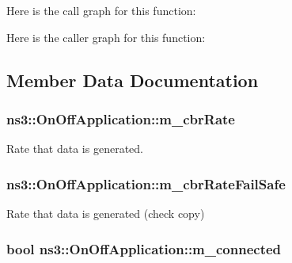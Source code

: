 Here is the call graph for this function\+:




Here is the caller graph for this function\+:




\subsection{Member Data Documentation}
\subsubsection[{\texorpdfstring{m\+\_\+cbr\+Rate}{m_cbrRate}}]{ ns3\+::\+On\+Off\+Application\+::m\+\_\+cbr\+Rate\hspace{0.3cm}{\ttfamily [private]}}\hypertarget{classns3_1_1OnOffApplication_ae81a8be6c1ce4bef91e89cc2c44e5bcf}{}\label{classns3_1_1OnOffApplication_ae81a8be6c1ce4bef91e89cc2c44e5bcf}


Rate that data is generated. 

\subsubsection[{\texorpdfstring{m\+\_\+cbr\+Rate\+Fail\+Safe}{m_cbrRateFailSafe}}]{ ns3\+::\+On\+Off\+Application\+::m\+\_\+cbr\+Rate\+Fail\+Safe\hspace{0.3cm}{\ttfamily [private]}}\hypertarget{classns3_1_1OnOffApplication_a71655d4955026c0c9d9a39a9e92953d6}{}\label{classns3_1_1OnOffApplication_a71655d4955026c0c9d9a39a9e92953d6}


Rate that data is generated (check copy) 

\subsubsection[{\texorpdfstring{m\+\_\+connected}{m_connected}}]{\setlength{\rightskip}{0pt plus 5cm}bool ns3\+::\+On\+Off\+Application\+::m\+\_\+connected\hspace{0.3cm}{\ttfamily [private]}}\hypertarget{classns3_1_1OnOffApplication_a232122e7bfefaf01debf80f61621ed1e}{}\label{classns3_1_1OnOffApplication_a232122e7bfefaf01debf80f61621ed1e}


